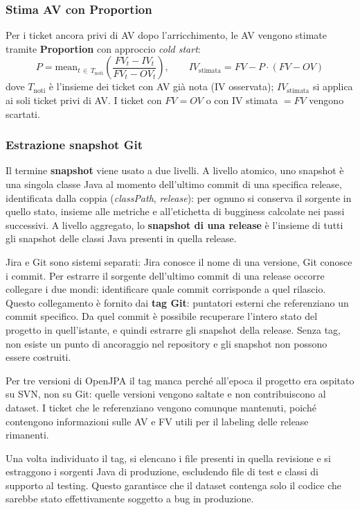 \subsubsection{Stima AV con Proportion}

Per i ticket ancora privi di AV dopo l'arricchimento, le AV vengono stimate tramite
\textbf{Proportion} con approccio \emph{cold start}:
\[
P = \text{mean}_{t \,\in\, T_{\text{noti}}}\!\left(\frac{FV_t - IV_t}{FV_t - OV_t}\right), \qquad IV_{\text{stimata}} = FV - P \cdot (FV - OV)
\]
dove $T_{\text{noti}}$ è l'insieme dei ticket con AV già nota (IV osservata); $IV_{\text{stimata}}$
si applica ai soli ticket privi di AV. I ticket con $FV = OV$ o con IV stimata $= FV$ vengono scartati.

\subsubsection{Estrazione snapshot Git}

Il termine \textbf{snapshot} viene usato a due livelli. A livello atomico, uno snapshot
è una singola classe Java al momento dell'ultimo commit di una specifica release,
identificata dalla coppia (\emph{classPath}, \emph{release}): per ognuno si conserva il
sorgente in quello stato, insieme alle metriche e all'etichetta di bugginess calcolate
nei passi successivi. A livello aggregato, lo \textbf{snapshot di una release} è l'insieme di tutti
gli snapshot delle classi Java presenti in quella release.

Jira e Git sono sistemi separati: Jira conosce il nome di una versione, Git conosce i
commit. Per estrarre il sorgente dell'ultimo commit di una release occorre collegare i due mondi:
identificare quale commit corrisponde a quel rilascio. Questo collegamento è fornito dai \textbf{tag Git}: puntatori esterni che referenziano un
commit specifico. Da quel commit è
possibile recuperare l'intero stato del progetto in quell'istante, e quindi estrarre gli
snapshot della release. Senza tag, non esiste un punto di ancoraggio nel repository e gli
snapshot non possono essere costruiti.

Per tre versioni di OpenJPA il tag manca perché all'epoca il progetto era ospitato su SVN,
non su Git: quelle versioni vengono saltate e non contribuiscono al dataset. I ticket che
le referenziano vengono comunque mantenuti, poiché contengono informazioni sulle AV e FV
utili per il labeling delle release rimanenti.

Una volta individuato il tag, si elencano i file presenti in quella revisione e si
estraggono i sorgenti Java di produzione, escludendo file di test e classi di supporto
al testing. Questo garantisce che il dataset contenga solo il codice che sarebbe stato
effettivamente soggetto a bug in produzione.

